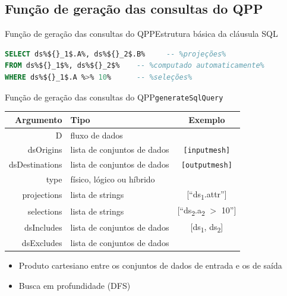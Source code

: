 \documentclass[12pt,compress]{beamer}
\begin{document}

\subsection*{Função de geração das consultas do QPP}

\begin{frame}[fragile]{Função de geração das consultas do QPP}{Estrutura básica da cláusula SQL}

\begin{lstlisting}[language=sql,deletendkeywords={TIME},basicstyle=\large]
SELECT ds%${}_1$.A%, ds%${}_2$.B%     -- %projeções%
FROM ds%${}_1$%, ds%${}_2$%    -- %computado automaticamente%
WHERE ds%${}_1$.A %>% 10%      -- %seleções%
\end{lstlisting}

\end{frame}


\begin{frame}[t]{Função de geração das consultas do QPP}{\texttt{generateSqlQuery}}

\vspace{-1cm}

\begin{table}
\centering
\begin{tabular}{r|l|c}
\toprule
\textbf{Argumento} & \textbf{Tipo} & \textbf{Exemplo}               \\
\midrule
D                  & fluxo de dados              \\
\alert{dsOrigins}          & lista de conjuntos de dados & \texttt{[inputmesh]} \\
\alert{dsDestinations}     & lista de conjuntos de dados & \texttt{[outputmesh]} \\
type               & físico, lógico ou híbrido   \\
projections        & lista de strings & [``ds\textsubscript{1}.attr'']             \\
selections         & lista de strings & [``ds\textsubscript{2}.a\textsubscript{2} $>$ 10'']            \\
dsIncludes         & lista de conjuntos de dados & [ds\textsubscript{1}, ds\textsubscript{2}] \\
dsExcludes         & lista de conjuntos de dados \\
\bottomrule
\end{tabular}
\end{table}

\vfill

\begin{itemize}
\item Produto cartesiano entre os conjuntos de dados de entrada e os de saída
\item Busca em profundidade (DFS)
\end{itemize}

\end{frame}
\end{document}
